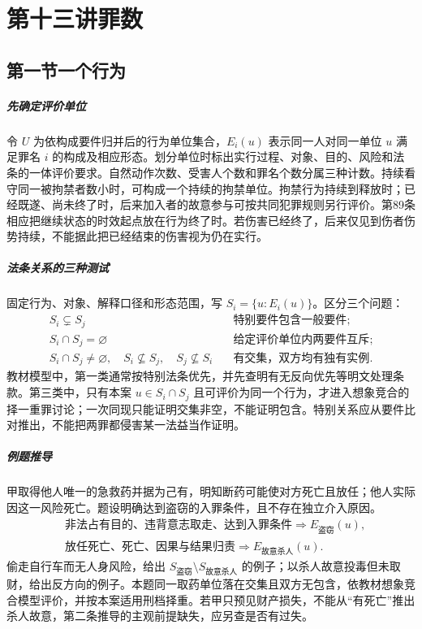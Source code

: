 \chapter{第十三讲\quad 罪数}
\label{lecture:13}
\par

\section{第一节\quad 一个行为}
\paragraph{先确定评价单位}
令 \(U\) 为依构成要件归并后的行为单位集合，\(E_i(u)\) 表示同一人对同一单位 \(u\) 满足罪名 \(i\) 的构成及相应形态。划分单位时标出实行过程、对象、目的、风险和法条的一体评价要求。自然动作次数、受害人个数和罪名个数分属三种计数。持续看守同一被拘禁者数小时，可构成一个持续的拘禁单位。拘禁行为持续到释放时；已经既遂、尚未终了时，后来加入者的故意参与可按共同犯罪规则另行评价。第89条相应把继续状态的时效起点放在行为终了时。若伤害已经终了，后来仅见到伤者伤势持续，不能据此把已经结束的伤害视为仍在实行。

\paragraph{法条关系的三种测试}
固定行为、对象、解释口径和形态范围，写 \(S_i=\{u:E_i(u)\}\)。区分三个问题：
\[
\begin{aligned}
 S_i\subsetneq S_j &\quad\text{特别要件包含一般要件};\\
 S_i\cap S_j=\varnothing &\quad\text{给定评价单位内两要件互斥};\\
 S_i\cap S_j\ne\varnothing,\quad
 S_i\nsubseteq S_j,\quad S_j\nsubseteq S_i
 &\quad\text{有交集，双方均有独有实例}.
\end{aligned}
\]
教材模型中，第一类通常按特别法条优先，并先查明有无反向优先等明文处理条款。第三类中，只有本案 \(u\in S_i\cap S_j\) 且可评价为同一个行为，才进入想象竞合的择一重罪讨论；一次同现只能证明交集非空，不能证明包含。特别关系应从要件比对推出，不能把两罪都侵害某一法益当作证明。

\paragraph{例题推导}
甲取得他人唯一的急救药并据为己有，明知断药可能使对方死亡且放任；他人实际因这一风险死亡。题设明确达到盗窃的入罪条件，且不存在独立介入原因。
\[
\begin{aligned}
 &\text{非法占有目的、违背意志取走、达到入罪条件}
       \Longrightarrow E_{\text{盗窃}}(u),\\
 &\text{放任死亡、死亡、因果与结果归责}
       \Longrightarrow E_{\text{故意杀人}}(u).
\end{aligned}
\]
偷走自行车而无人身风险，给出 \(S_{\text{盗窃}}\setminus S_{\text{故意杀人}}\) 的例子；以杀人故意投毒但未取财，给出反方向的例子。本题同一取药单位落在交集且双方无包含，依教材想象竞合模型评价，并按本案适用刑档择重。若甲只预见财产损失，不能从“有死亡”推出杀人故意，第二条推导的主观前提缺失，应另查是否有过失。

